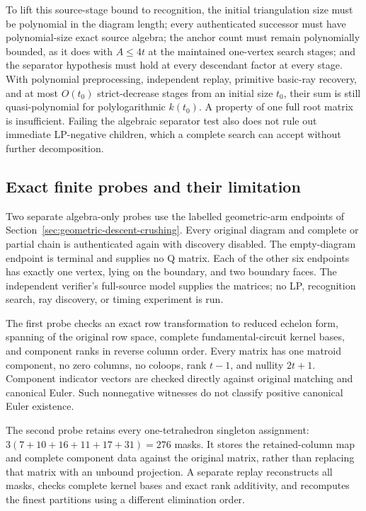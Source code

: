 To lift this source-stage bound to recognition, the initial triangulation
size must be polynomial in the diagram length; every authenticated successor
must have polynomial-size exact source algebra; the anchor count must remain
polynomially bounded, as it does with $A\le4t$ at the maintained one-vertex
search stages; and the separator hypothesis must hold at every descendant
factor at every stage.  With polynomial preprocessing, independent replay,
primitive basic-ray recovery, and at most
$O(t_0)$ strict-decrease stages from an initial size $t_0$, their sum is still
quasi-polynomial for polylogarithmic $k(t_0)$.  A property of one full root
matrix is insufficient.  Failing the algebraic separator test also does not
rule out immediate LP-negative children, which a complete search can accept
without further decomposition.

\subsection{Exact finite probes and their limitation}

Two separate algebra-only probes use the labelled geometric-arm endpoints
of Section~\ref{sec:geometric-descent-crushing}.  Every original diagram and
complete or partial chain is authenticated again with discovery disabled.
The empty-diagram endpoint is terminal and supplies no Q matrix.  Each
of the other six endpoints has exactly one vertex, lying on the boundary,
and two boundary faces.
The independent verifier's full-source model supplies the matrices; no LP,
recognition search, ray discovery, or timing experiment is run.

The first probe checks an exact row transformation to reduced echelon form,
spanning of the original row space, complete fundamental-circuit kernel
bases, and component ranks in reverse column order.  Every matrix has
one matroid component, no zero columns, no coloops, rank $t-1$, and
nullity $2t+1$.  Component indicator vectors are checked directly against
original matching and canonical Euler.  Such nonnegative witnesses do not
classify positive canonical Euler existence.

The second probe retains every one-tetrahedron singleton assignment:
$3(7+10+16+11+17+31)=276$ masks.  It stores the retained-column map and
complete component data against the original matrix, rather than replacing
that matrix with an unbound projection.  A separate replay reconstructs all
masks, checks complete kernel bases and exact rank additivity, and recomputes
the finest partitions using a different elimination order.

